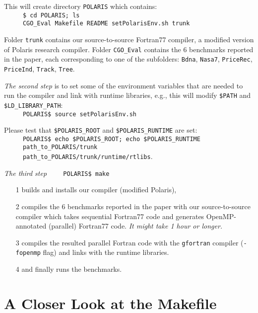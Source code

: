 \documentclass{sig-alternate}
\begin{document}
This will create directory {\tt POLARIS} which contains:\\
$\mbox{ }${\tt~~~~\$ cd POLARIS; ls}\\
$\mbox{ }${\tt~~~~CGO\_Eval  Makefile  README  setPolarisEnv.sh  trunk}\vspace{1ex}

Folder {\tt trunk} contains our source-to-source Fortran77 compiler,
a modified version of Polaris research compiler.
Folder {\tt CGO\_Eval} contains the 6 benchmarks reported in the paper,
    each corresponding to one of the subfolders: {\tt Bdna}, {\tt Nasa7},
    {\tt PriceRec}, {\tt PriceInd}, {\tt Track}, {\tt Tree}.

{\em The second step} is to set some of the environment variables
that are needed to run the compiler and link with runtime 
libraries, e.g., this will modify {\tt \$PATH} and {\tt \$LD\_LIBRARY\_PATH}:\\
$\mbox{ }${\tt~~~~POLARIS\$ source setPolarisEnv.sh}\vspace{1ex}

Please test that {\tt \$POLARIS\_ROOT} and {\tt \$POLARIS\_RUNTIME} are set:\\
$\mbox{ }${\tt~~~~POLARIS\$ echo \$POLARIS\_ROOT; echo \$POLARIS\_RUNTIME}\\
$\mbox{ }${\tt~~~~path\_to\_POLARIS/trunk}\\
$\mbox{ }${\tt~~~~path\_to\_POLARIS/trunk/runtime/rtlibs}.\vspace{2ex}

{\em The third step} {\tt~~~~POLARIS\$ make}
\begin{itemize}
    \item[1]  builds and installs our compiler (modified Polaris), 
    \item[2]  compiles the $6$ benchmarks reported in the paper with
             our source-to-source compiler 
             which takes sequential Fortran77 code and generates 
             OpenMP-annotated (parallel) Fortran77 code.
             {\em It might take 1 hour or longer.}
    \item[3] compiles the resulted parallel Fortran code
              with the {\tt gfortran} compiler ({\tt -fopenmp} flag) 
                and links with the runtime libraries.
    \item[4] and finally runs the benchmarks.
\end{itemize}

\section{A Closer Look at the Makefile}
\end{document}
